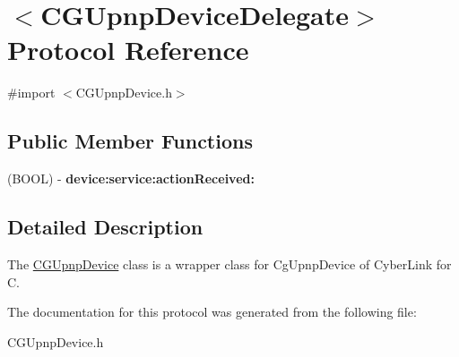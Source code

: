 \hypertarget{protocol_c_g_upnp_device_delegate-p}{\section{$<$C\-G\-Upnp\-Device\-Delegate$>$ Protocol Reference}
\label{protocol_c_g_upnp_device_delegate-p}
}


{\ttfamily \#import $<$C\-G\-Upnp\-Device.\-h$>$}

\subsection*{Public Member Functions}
\begin{DoxyCompactItemize}
\item 
\hypertarget{protocol_c_g_upnp_device_delegate-p_ada2af000af519995d4d5637a52cc32d4}{(B\-O\-O\-L) -\/ {\bfseries device\-:service\-:action\-Received\-:}}\label{protocol_c_g_upnp_device_delegate-p_ada2af000af519995d4d5637a52cc32d4}

\end{DoxyCompactItemize}


\subsection{Detailed Description}
The \hyperlink{interface_c_g_upnp_device}{C\-G\-Upnp\-Device} class is a wrapper class for Cg\-Upnp\-Device of Cyber\-Link for C. 

The documentation for this protocol was generated from the following file\-:\begin{DoxyCompactItemize}
\item 
C\-G\-Upnp\-Device.\-h\end{DoxyCompactItemize}
